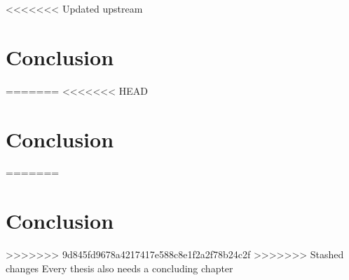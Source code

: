 <<<<<<< Updated upstream
\chapter{Conclusion}

=======
<<<<<<< HEAD
\chapter{Conclusion}

=======
\chapter{Conclusion}

>>>>>>> 9d845fd9678a4217417e588c8e1f2a2f78b24c2f
>>>>>>> Stashed changes
Every thesis also needs a concluding chapter